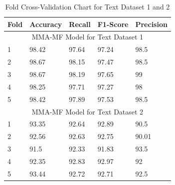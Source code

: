 \begin{table}[H]
    \centering
    \begin{tabular}{|p{2cm}|p{2cm}|p{2cm}|p{2cm}|p{2cm}|}
         \hline
         Fold & Accuracy & Recall & F1-Score & Precision  \\
         \hline
         \multicolumn{5}{|c|}{MMA-MF Model for Text Dataset 1}\\
         \hline
         1 & 98.42 & 97.64 & 97.24 & 98.5 \\
         \hline
         2 & 98.67 & 98.15 & 97.47 & 98.5 \\
         \hline
         3 & 98.67 & 98.19 & 97.65 & 99 \\
         \hline
         4 & 98.25 & 97.71 & 97.27 & 98 \\
         \hline
         5 & 98.42 & 97.89 & 97.53 & 98.5 \\
         \hline
         \multicolumn{5}{|c|}{MMA-MF Model for Text Dataset 2}\\
         \hline
         1 & 93.35 & 92.64 & 92.89 & 90.5 \\
         \hline
         2 & 92.56 & 92.63 & 92.75 & 90.01 \\
         \hline
         3 & 91.5 & 92.33 & 91.83 & 93.5 \\
         \hline
         4 & 92.35 & 92.83 & 92.97 & 92 \\
         \hline
         5 & 93.44 & 92.72 & 92.71 & 92.5 \\
         \hline
    \end{tabular}
    \caption{Fold Cross-Validation Chart for Text Dataset 1 and 2}
    \label{tab:mma-mf}
\end{table}